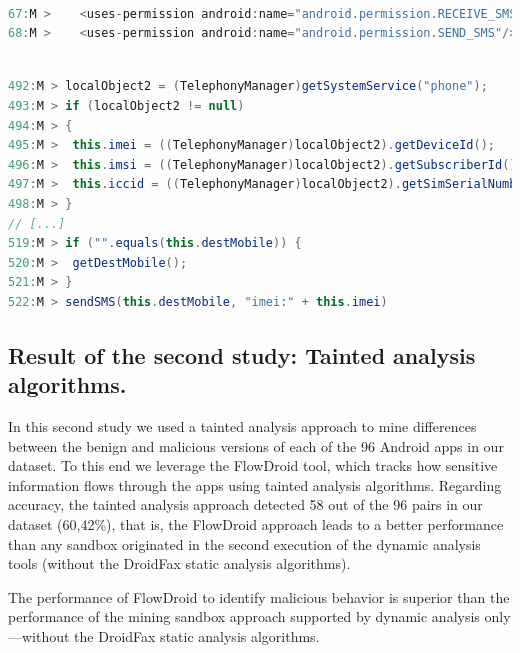 \begin{lstlisting}[caption= AndroidManifest.xml - App 47, language=Java, basicstyle=\tiny,label={lst:app47:androidmanifest}]

67:M >    <uses-permission android:name="android.permission.RECEIVE_SMS"/>
68:M >    <uses-permission android:name="android.permission.SEND_SMS"/>
\end{lstlisting}

\begin{lstlisting}[caption= com/android/main/MainService.java - App 47, language=Java, basicstyle=\tiny,label={lst:app47:mainservice}]

492:M > localObject2 = (TelephonyManager)getSystemService("phone");
493:M > if (localObject2 != null)
494:M > {
495:M >  this.imei = ((TelephonyManager)localObject2).getDeviceId();
496:M >  this.imsi = ((TelephonyManager)localObject2).getSubscriberId();
497:M >  this.iccid = ((TelephonyManager)localObject2).getSimSerialNumber();
498:M > }
// [...]
519:M > if ("".equals(this.destMobile)) {
520:M >  getDestMobile();
521:M > }
522:M > sendSMS(this.destMobile, "imei:" + this.imei)
\end{lstlisting}




\subsection{Result of the second study: Tainted analysis algorithms.}\label{sec:res-ss}

In this second study we used a tainted analysis approach to mine differences between the benign and malicious versions of each of the 96 Android apps in our dataset. To this end we leverage the FlowDroid tool, which tracks how sensitive information flows through the apps using tainted analysis algorithms. Regarding accuracy, the tainted analysis approach detected 58 out of the 96 pairs in our dataset (60,42\%), that is, the FlowDroid approach leads to a better performance than any sandbox originated in the second execution of the dynamic analysis tools (without the DroidFax static analysis algorithms).

\begin{finding}
  The performance of FlowDroid to identify malicious behavior
  is superior than the performance of the
  mining sandbox approach supported by dynamic analysis only---without
  the DroidFax static analysis algorithms.
\end{finding}

